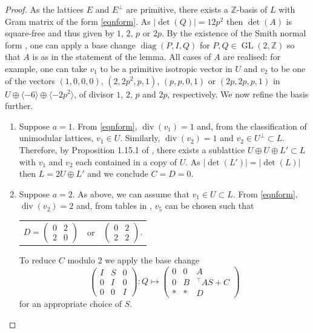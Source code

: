 \documentclass[11pt]{article}
\newcommand{\ZZ}{\mathbb{Z}}
\newcommand{\la}{\langle}
\newcommand{\ra}{\rangle}
\newcommand{\opn}{\operatorname}
\newcommand{\op}{\oplus}
\newcommand{\beq}{\begin{equation*}}
\newcommand{\eeq}{\end{equation*}}
\newcommand{\bpm}{\begin{pmatrix}}
\newcommand{\epm}{\end{pmatrix}}
\begin{document}
  \begin{proof}
    As the lattices $E$ and $E^{\perp}$ are primitive,  there exists a $\ZZ$-basis of $L$ with Gram matrix of the form \eqref{eqnform}.
As $\vert \opn{det}(Q) \vert = 12p^2$ then $\opn{det}(A)$ is square-free and thus given  by $1$, $2$, $p$ or $2p$.
        By the existence of the Smith normal form \cite{Newman},  one can apply a base change $\opn{diag}(P, I, Q)$ for $P, Q \in \opn{GL}(2, \ZZ)$ so that $A$ is as in the statement of the lemma.
        All cases of $A$ are realised: for example, one can take $v_1$ to be a primitive isotropic vector in $U$ and $v_2$ to be one of the vectors
        $(1,0,0,0)$,
        $(2, 2p^2, p, 1)$,
        $(p,p,0,1)$ or
        $(2p, 2p, p, 1)$ in
        $U \op \la -6 \ra \op \la -2p^2 \ra$, of divisor $1$, $2$, $p$ and $2p$, respectively.
        We now refine the basis further.
        \begin{enumerate}
    \item Suppose $a=1$.
      From \eqref{eqnform}, $\opn{div}(v_1)=1$ and, from the classification of unimodular lattices, $v_1 \in U$.
      Similarly, $\opn{div}(v_2)=1$ and $v_2 \in U^{\perp} \subset L$.
      Therefore, by Proposition 1.15.1 of \cite{Nikulin}, there exists a sublattice $U \op U \op L' \subset L$ with $v_1$ and $v_2$ each contained in a copy of $U$.
      As $\vert \opn{det}(L') \vert = \vert \opn{det}(L) \vert$ then  $L = 2U \op L'$ and we conclude $C=D=0$.
    \item Suppose $a=2$.
      As above, we can assume that $v_1 \in U \subset L$.
      From \eqref{eqnform}, $\opn{div}(v_2)=2$ and, from tables in \cite{SPLAG}, $v_5$ can be chosen such that
      \begin{center}
        \begin{tabular}{c c c}
          $D = \bpm 0 & 2 \\ 2 & 0 \epm$
          & or &
          $\bpm 0 & 2 \\ 2 & 2 \epm$.
        \end{tabular}
      \end{center}
      To reduce $C$ modulo $2$ we apply the base change
      \beq
      \bpm
      I & S & 0 \\
      0 & I & 0 \\
      0 & 0 & I
      \epm:
      Q \mapsto
      \bpm
      0 & 0 & A \\
      0 & B & {}^{\intercal}AS + C \\
      * & * & D
      \epm
      \eeq
      for an appropriate choice of $S$.

\end{enumerate}
\end{proof}
\end{document}
